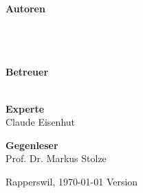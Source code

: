 \begin{titlepage}
\begin{center}
		\vfill
	\end{center}
	
		
	\begin{flushleft}
		\textbf{\Large Autoren}\\
		\Large \rlif \\
		\Large \chuf \\
		\Large \fscf \\
		\vspace{0.5cm}
		
		\textbf{\Large Betreuer}\\
		\Large \proff\\
		\vspace{0.3cm}
		
		\textbf{\Large Experte}\\
		\Large Claude Eisenhut
		\vspace{0.3cm}

		\textbf{\Large Gegenleser}\\
		\Large Prof. Dr. Markus Stolze
		\vspace{0.3cm}
		
		\vspace{1.5cm}
		 Rapperswil, \today
		\hfill
		Version \version
	\end{flushleft}

\end{titlepage}

\restoregeometry
